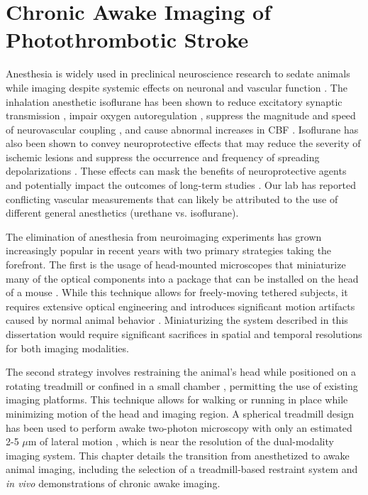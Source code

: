 
\chapter{Chronic Awake Imaging of Photothrombotic Stroke} \label{ch:awake}

Anesthesia is widely used in preclinical neuroscience research to sedate animals while imaging despite systemic effects on neuronal and vascular function \cite{Janssen:2004ih}. The inhalation anesthetic isoflurane has been shown to reduce excitatory synaptic transmission \cite{BergJohnsen:1992wk}, impair oxygen autoregulation \cite{Aksenov:2012wh}, suppress the magnitude and speed of neurovascular coupling \cite{Pisauro:2013cx}, and cause abnormal increases in CBF \cite{Strebel:1995uh}. Isoflurane has also been shown to convey neuroprotective effects that may reduce the severity of ischemic lesions \cite{Sakai:2007wc, Burchell:2013tj} and suppress the occurrence and frequency of spreading depolarizations \cite{Kudo:2016ho}. These effects can mask the benefits of neuroprotective agents and potentially impact the outcomes of long-term studies \cite{Kapinya:ua, Seto:2014ga}. Our lab has reported \cite{Ponticorvo:2010uv, Kazmi:2013ey, Sullender:2018ff} conflicting vascular  measurements that can likely be attributed to the use of different general anesthetics (urethane vs. isoflurane).

The elimination of anesthesia from neuroimaging experiments has grown increasingly popular in recent years with two primary strategies taking the forefront. The first is the usage of head-mounted microscopes that miniaturize many of the optical components into a package that can be installed on the head of a mouse \cite{Gu:1999ky, Helmchen:2001tw, Flusberg:2005tq}. While this technique allows for freely-moving tethered subjects, it requires extensive optical engineering and introduces significant motion artifacts caused by normal animal behavior \cite{Helmchen:2001tw}. Miniaturizing the system described in this dissertation would require significant sacrifices in spatial and temporal resolutions for both imaging modalities.

The second strategy involves restraining the animal's head while positioned on a rotating treadmill \cite{Pisauro:2013cx, Dombeck:2007gr, Wienisch:2011ju, Kaifosh:2013fy, Heiney:2018gq} or confined in a small chamber \cite{Silasi:2016dq}, permitting the use of existing imaging platforms. This technique allows for walking or running in place while minimizing motion of the head and imaging region. A spherical treadmill design has been used to perform awake two-photon microscopy with only an estimated 2-5 $\mu$m of lateral motion \cite{Dombeck:2007gr}, which is near the resolution of the dual-modality imaging system. This chapter details the transition from anesthetized to awake animal imaging, including the selection of a treadmill-based restraint system and \textit{in vivo} demonstrations of chronic awake imaging.



